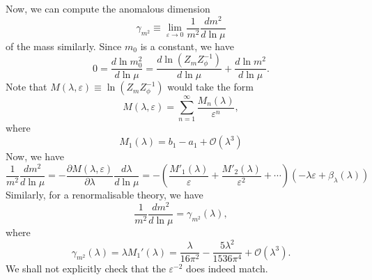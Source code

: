 \begin{solution}
    Now, we can compute the anomalous dimension
    \begin{equation}
        \gamma_{m^2}\equiv\lim_{\varepsilon\to0} \frac{1}{m^2}\frac{dm^2}{d\ln\mu}
    \end{equation}
    of the mass similarly. Since $m_0$ is a constant, we have
    \begin{equation}
        0 = \frac{d\ln m_0^2}{d\ln \mu} = \frac{d\ln (Z_mZ_\phi^{-1})}{d\ln\mu}+ \frac{d\ln m^2}{d\ln \mu}.
    \end{equation}
    Note that $M(\lambda,\varepsilon) \equiv\ln (Z_mZ_\phi^{-1})$ would take the form
    \begin{equation}
        M(\lambda,\varepsilon) = \sum_{n=1}^\infty\frac{M_n(\lambda)}{\varepsilon^n},
    \end{equation}
    where
    \begin{equation}
        M_1(\lambda) = b_1 - a_1 + \mathcal{O}(\lambda^3)
    \end{equation}
    Now, we have
    \begin{equation}
        \frac{1}{m^2}\frac{d m^2}{d\ln\mu} =  - \frac{\partial M(\lambda,\varepsilon)}{\partial\lambda}\frac{d\lambda}{d\ln \mu} = -\left(\frac{ M'_1(\lambda)}{\varepsilon} + \frac{M'_2(\lambda)}{\varepsilon^2}+\cdots\right)(-\lambda\varepsilon + \beta_\lambda(\lambda))
    \end{equation}
    Similarly, for a renormalisable theory, we have
    \begin{equation}
        \frac{1}{m^2}\frac{d m^2}{d\ln\mu} = \gamma_{m^2}(\lambda),
    \end{equation}
    where 
    \begin{equation}
        \gamma_{m^2}(\lambda) = \lambda M_1'(\lambda) = \frac{\lambda}{16\pi^2} - \frac{5\lambda^2}{1536\pi^4} + \mathcal{O}(\lambda^3).
    \end{equation}
    We shall not explicitly check that the $\varepsilon^{-2}$ does indeed match.
\end{solution}

